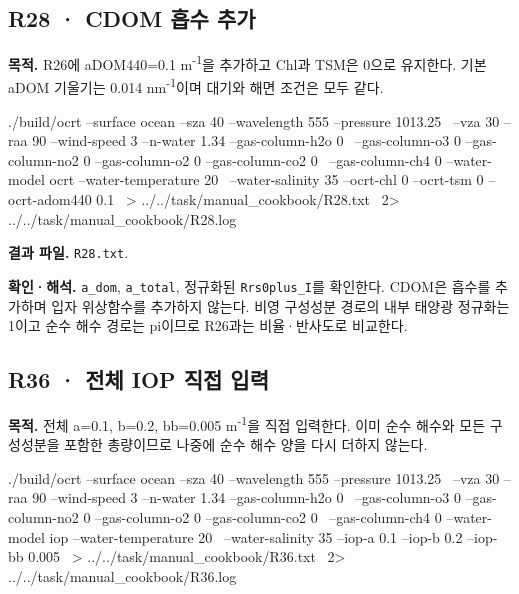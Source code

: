 \clearpage

\subsection{R28 · CDOM 흡수 추가}
\label{sec:auto:09_cookbook:5.2}

\label{recipe:R28}

\textbf{목적. }R26에 aDOM440=0.1 m\textsuperscript{-1}을 추가하고 Chl과 TSM은 0으로 유지한다. 기본 aDOM 기울기는 0.014 nm\textsuperscript{-1}이며 대기와 해면 조건은 모두 같다.

\noindent\begin{minipage}{\linewidth}
\begin{ManualCode}

./build/ocrt --surface ocean --sza 40 --wavelength 555 --pressure 1013.25 \
  --vza 30 --raa 90 --wind-speed 3 --n-water 1.34 --gas-column-h2o 0 \
  --gas-column-o3 0 --gas-column-no2 0 --gas-column-o2 0 --gas-column-co2 0 \
  --gas-column-ch4 0 --water-model ocrt --water-temperature 20 \
  --water-salinity 35 --ocrt-chl 0 --ocrt-tsm 0 --ocrt-adom440 0.1 \
  > ../../task/manual_cookbook/R28.txt \
  2> ../../task/manual_cookbook/R28.log

\end{ManualCode}
\end{minipage}\par

\textbf{결과 파일. }\texttt{R28.txt}.

\textbf{확인·해석. }\texttt{a\_\allowbreak{}dom}, \texttt{a\_\allowbreak{}total}, 정규화된 \texttt{Rrs0plus\_\allowbreak{}I}를 확인한다. CDOM은 흡수를 추가하며 입자 위상함수를 추가하지 않는다. 비영 구성성분 경로의 내부 태양광 정규화는 1이고 순수 해수 경로는 pi이므로 R26과는 비율·반사도로 비교한다.

\clearpage

\subsection{R36 · 전체 IOP 직접 입력}
\label{sec:auto:09_cookbook:5.3}

\label{recipe:R36}

\textbf{목적. }전체 a=0.1, b=0.2, bb=0.005 m\textsuperscript{-1}을 직접 입력한다. 이미 순수 해수와 모든 구성성분을 포함한 총량이므로 나중에 순수 해수 양을 다시 더하지 않는다.

\noindent\begin{minipage}{\linewidth}
\begin{ManualCode}

./build/ocrt --surface ocean --sza 40 --wavelength 555 --pressure 1013.25 \
  --vza 30 --raa 90 --wind-speed 3 --n-water 1.34 --gas-column-h2o 0 \
  --gas-column-o3 0 --gas-column-no2 0 --gas-column-o2 0 --gas-column-co2 0 \
  --gas-column-ch4 0 --water-model iop --water-temperature 20 \
  --water-salinity 35 --iop-a 0.1 --iop-b 0.2 --iop-bb 0.005 \
  > ../../task/manual_cookbook/R36.txt \
  2> ../../task/manual_cookbook/R36.log

\end{ManualCode}
\end{minipage}\par

